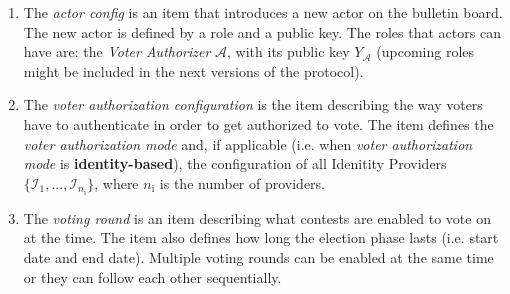 \begin{enumerate}
    \item The \textit{actor config} is an item that introduces a new actor on the bulletin board. The new actor is defined by a role and a public key. The roles that actors can have are: the \textit{Voter Authorizer} $\mathcal{A}$, with its public key $Y_\mathcal{A}$ (upcoming roles might be included in the next versions of the protocol).

    \item The \textit{voter authorization configuration} is the item describing the way voters have to authenticate in order to get authorized to vote. The item defines the \textit{voter authorization mode} and, if applicable (i.e. when \textit{voter authorization mode} is \textbf{identity-based}), the configuration of all Idenitity Providers $\{\mathcal{I}_1, ..., \mathcal{I}_{n_\mathrm{i}}\}$, where $n_\mathrm{i}$ is the number of providers.
    
    \item The \textit{voting round} is an item describing what contests are enabled to vote on at the time. The item also defines how long the election phase lasts (i.e. start date and end date). Multiple voting rounds can be enabled at the same time or they can follow each other sequentially.
\end{enumerate}


